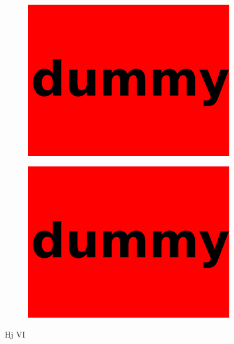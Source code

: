 \begin{figure}
\begin{subfigure}[]{0.49\textwidth}
	\includegraphics[width=\textwidth]{images/dummy.pdf}
\end{subfigure}
\begin{subfigure}[]{0.49\textwidth}
	\includegraphics[width=\textwidth]{images/dummy.pdf}
\end{subfigure}
\caption{Hj VI}
\end{figure}
%
